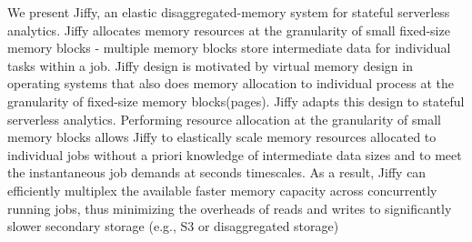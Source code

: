 We present Jiffy, an elastic disaggregated-memory system for stateful serverless analytics. Jiffy allocates memory resources at the granularity of small fixed-size memory blocks - multiple memory blocks store intermediate data for individual tasks within a job. Jiffy design is motivated by virtual memory design in operating systems that also does memory allocation to individual process at the granularity of fixed-size memory blocks(pages). Jiffy adapts this design to stateful serverless analytics. Performing resource allocation at the granularity of small memory blocks allows Jiffy to elastically scale memory resources allocated to individual jobs without a priori knowledge of intermediate data sizes and to meet the instantaneous job demands at seconds timescales. As a result, Jiffy can efficiently multiplex the available faster memory capacity across concurrently running jobs, thus minimizing the overheads of reads and writes to significantly slower secondary storage (e.g., S3 or disaggregated storage)


